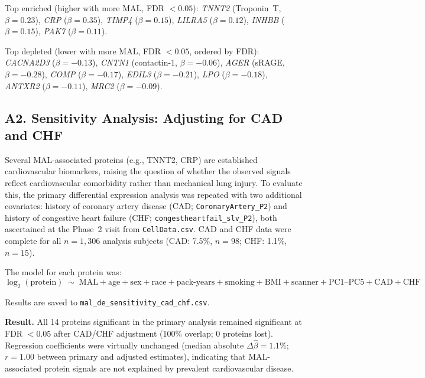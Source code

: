 \documentclass[11pt, letterpaper]{article}
\begin{document}
Top enriched (higher with more MAL, FDR $< 0.05$):
\textit{TNNT2} (Troponin~T, $\beta = 0.23$),
\textit{CRP} ($\beta = 0.35$),
\textit{TIMP4} ($\beta = 0.15$),
\textit{LILRA5} ($\beta = 0.12$),
\textit{INHBB} ($\beta = 0.15$),
\textit{PAK7} ($\beta = 0.11$).

Top depleted (lower with more MAL, FDR $< 0.05$, ordered by FDR):
\textit{CACNA2D3} ($\beta = -0.13$),
\textit{CNTN1} (contactin-1, $\beta = -0.06$),
\textit{AGER} (sRAGE, $\beta = -0.28$),
\textit{COMP} ($\beta = -0.17$),
\textit{EDIL3} ($\beta = -0.21$),
\textit{LPO} ($\beta = -0.18$),
\textit{ANTXR2} ($\beta = -0.11$),
\textit{MRC2} ($\beta = -0.09$).

\subsection*{A2. Sensitivity Analysis: Adjusting for CAD and CHF}

Several MAL-associated proteins (e.g., TNNT2, CRP) are established
cardiovascular biomarkers, raising the question of whether the observed
signals reflect cardiovascular comorbidity rather than mechanical lung
injury. To evaluate this, the primary differential expression analysis
was repeated with two additional covariates: history of coronary artery
disease (CAD; \texttt{CoronaryArtery\_P2}) and history of congestive
heart failure (CHF; \texttt{congestheartfail\_slv\_P2}), both ascertained at the Phase~2 visit from
\texttt{CellData.csv}. CAD and CHF data were complete for all
$n = 1{,}306$ analysis subjects (CAD: 7.5\%, $n = 98$;
CHF: 1.1\%, $n = 15$).

The model for each protein was:
\[
  \log_2(\text{protein}) \;\sim\; \text{MAL} + \text{age} + \text{sex}
  + \text{race} + \text{pack-years} + \text{smoking} + \text{BMI}
  + \text{scanner} + \text{PC1--PC5} + \text{CAD} + \text{CHF}
\]

Results are saved to \texttt{mal\_de\_sensitivity\_cad\_chf.csv}.

\textbf{Result.} All 14 proteins significant in the primary analysis
remained significant at FDR $< 0.05$ after CAD/CHF adjustment (100\%
overlap; 0 proteins lost). Regression coefficients were virtually
unchanged (median absolute $\Delta\hat\beta = 1.1\%$;
$r = 1.00$ between primary and adjusted estimates), indicating that
MAL-associated protein signals are not explained by prevalent
cardiovascular disease.

\end{document}
